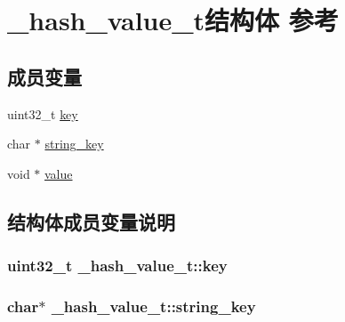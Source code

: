 \hypertarget{a00016}{}\section{\+\_\+hash\+\_\+value\+\_\+t结构体 参考}
\label{a00016}
\subsection*{成员变量}
\begin{DoxyCompactItemize}
\item 
uint32\+\_\+t \hyperlink{a00016_a7159c9891911dc975ebf4134db49e82b_a7159c9891911dc975ebf4134db49e82b}{key}
\item 
char $\ast$ \hyperlink{a00016_a4bf4b998778e8dbda180743cc4da375a_a4bf4b998778e8dbda180743cc4da375a}{string\+\_\+key}
\item 
void $\ast$ \hyperlink{a00016_a2137cdf6c18ab110ebe2a6b0edce5017_a2137cdf6c18ab110ebe2a6b0edce5017}{value}
\end{DoxyCompactItemize}


\subsection{结构体成员变量说明}
\hypertarget{a00016_a7159c9891911dc975ebf4134db49e82b_a7159c9891911dc975ebf4134db49e82b}{}
\subsubsection[{key}]{\setlength{\rightskip}{0pt plus 5cm}uint32\+\_\+t \+\_\+hash\+\_\+value\+\_\+t\+::key}\label{a00016_a7159c9891911dc975ebf4134db49e82b_a7159c9891911dc975ebf4134db49e82b}
\hypertarget{a00016_a4bf4b998778e8dbda180743cc4da375a_a4bf4b998778e8dbda180743cc4da375a}{}
\subsubsection[{string\+\_\+key}]{\setlength{\rightskip}{0pt plus 5cm}char$\ast$ \+\_\+hash\+\_\+value\+\_\+t\+::string\+\_\+key}\label{a00016_a4bf4b998778e8dbda180743cc4da375a_a4bf4b998778e8dbda180743cc4da375a}
\hypertarget{a00016_a2137cdf6c18ab110ebe2a6b0edce5017_a2137cdf6c18ab110ebe2a6b0edce5017}{}
